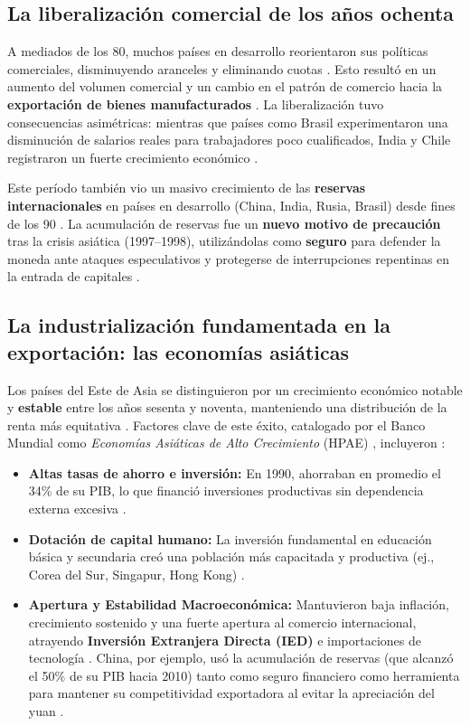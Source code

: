 \subsection{La liberalización comercial de los años ochenta}
A mediados de los 80, muchos países en desarrollo reorientaron sus políticas comerciales, disminuyendo aranceles y eliminando cuotas . Esto resultó en un aumento del volumen comercial y un cambio en el patrón de comercio hacia la \textbf{exportación de bienes manufacturados} . La liberalización tuvo consecuencias asimétricas: mientras que países como Brasil experimentaron una disminución de salarios reales para trabajadores poco cualificados, India y Chile registraron un fuerte crecimiento económico .

Este período también vio un masivo crecimiento de las \textbf{reservas internacionales} en países en desarrollo (China, India, Rusia, Brasil) desde fines de los 90 . La acumulación de reservas fue un \textbf{nuevo motivo de precaución} tras la crisis asiática (1997–1998), utilizándolas como \textbf{seguro} para defender la moneda ante ataques especulativos y protegerse de interrupciones repentinas en la entrada de capitales .

\subsection{La industrialización fundamentada en la exportación: las economías asiáticas}
Los países del Este de Asia se distinguieron por un crecimiento económico notable y \textbf{estable} entre los años sesenta y noventa, manteniendo una distribución de la renta más equitativa . Factores clave de este éxito, catalogado por el Banco Mundial como \textit{Economías Asiáticas de Alto Crecimiento} (HPAE) , incluyeron :
\begin{itemize}
    \item \textbf{Altas tasas de ahorro e inversión:} En 1990, ahorraban en promedio el 34\% de su PIB, lo que financió inversiones productivas sin dependencia externa excesiva .
    \item \textbf{Dotación de capital humano:} La inversión fundamental en educación básica y secundaria creó una población más capacitada y productiva (ej., Corea del Sur, Singapur, Hong Kong) .
    \item \textbf{Apertura y Estabilidad Macroeconómica:} Mantuvieron baja inflación, crecimiento sostenido y una fuerte apertura al comercio internacional, atrayendo \textbf{Inversión Extranjera Directa (IED)} e importaciones de tecnología . China, por ejemplo, usó la acumulación de reservas (que alcanzó el 50\% de su PIB hacia 2010) tanto como seguro financiero como herramienta para mantener su competitividad exportadora al evitar la apreciación del yuan .
\end{itemize}

